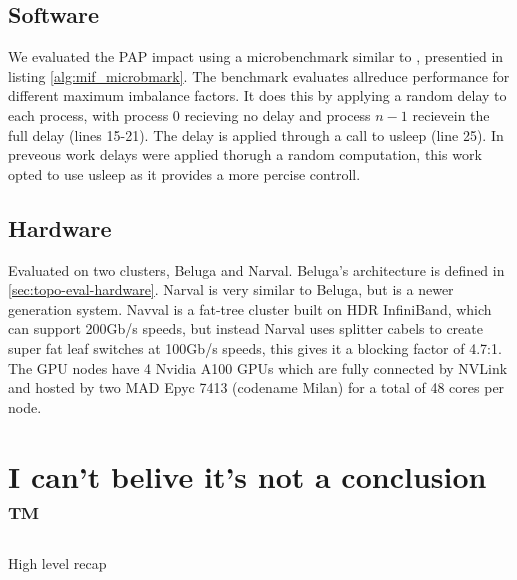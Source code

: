\subsection{Software}
We evaluated the PAP impact using a microbenchmark similar to \cite{Faraj2008StudyProcArrivalMPIColl}, presentied in listing \ref{alg:mif_microbmark}.
The benchmark evaluates allreduce performance for different maximum imbalance factors. 
It does this by applying a random delay to each process, with process 0 recieving no delay and process $n-1$ recievein the full delay (lines 15-21).
The delay is applied through a call to usleep (line 25).
In preveous work \cite{Faraj2008StudyProcArrivalMPIColl, Alizadeh2022PAPCollDL} delays were applied thorugh a random computation, this work opted to use usleep as it provides a more percise controll.



\subsection{Hardware}
Evaluated on two clusters, Beluga and Narval.
Beluga's architecture is defined in \ref{sec:topo-eval-hardware}.
Narval is very similar to Beluga, but is a newer generation system.
Navval is a fat-tree cluster built on HDR InfiniBand, which can support 200Gb/s speeds, but instead Narval uses splitter cabels to create super fat leaf switches at 100Gb/s speeds, this gives it a blocking factor of 4.7:1.
The GPU nodes have 4 Nvidia A100 GPUs which are fully connected by NVLink and hosted by two MAD Epyc 7413 (codename Milan) for a total of 48 cores per node.





% 

\section{I can't belive it's not a conclusion ™}
High level recap

